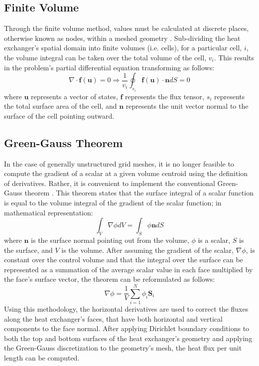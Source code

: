 \documentclass{article}
\begin{document}
\subsection{Finite Volume}
Through the finite volume method, values must be calculated at discrete places, otherwise known as nodes, within a meshed geometry \cite{Eymard2000}. Sub-dividing the heat exchanger's spatial domain into finite volumes (i.e. cells), for a particular cell, $i$, the volume integral can be taken over the total volume of the cell, $v_i$. This results in the problem's partial differential equation transforming as follows:
\begin{equation}
   \nabla \cdot \mathbf{f}(\mathbf{u}) = 0 \Rightarrow \frac{1}{v_i} \oint_{s_i} \mathbf{f}(\mathbf{u}) \cdot \mathbf{n} dS = 0
\end{equation}
where $\mathbf{u}$ represents a vector of states, $\mathbf{f}$ represents the flux tensor, $s_i$ represents the total surface area of the cell, and $\mathbf{n}$ represents the unit vector normal to the surface of the cell pointing outward.

\subsection{Green-Gauss Theorem}
In the case of generally unstructured grid meshes, it is no longer feasible to compute the gradient of a scalar at a given volume centroid using the definition of derivatives. Rather, it is convenient to implement the conventional Green-Gauss theorem \cite{Pfeffer1991}. This theorem states that the surface integral of a scalar function is equal to the volume integral of the gradient of the scalar function; in mathematical representation:
\begin{equation}
   \int_V \nabla \phi dV = \int_S \phi \mathbf{n} dS
\end{equation}
where $\mathbf{n}$ is the surface normal pointing out from the volume, $\phi$ is a scalar, $S$ is the surface, and $V$ is the volume. After assuming the gradient of the scalar, $\nabla \phi$, is constant over the control volume and that the integral over the surface can be represented as a summation of the average scalar value in each face multiplied by the face's surface vector, the theorem can be reformulated as follows:
\begin{equation}
   \nabla \phi = \frac{1}{V} \sum_{i=1}^{N} \phi_i \mathbf{S}_i
\end{equation}
Using this methodology, the horizontal derivatives are used to correct the fluxes along the heat exchanger's faces, that have both horizontal and vertical components to the face normal. After applying Dirichlet boundary conditions to both the top and bottom surfaces of the heat exchanger's geometry and applying the Green-Gauss discretization to the geometry's mesh, the heat flux per unit length can be computed.
\end{document}
